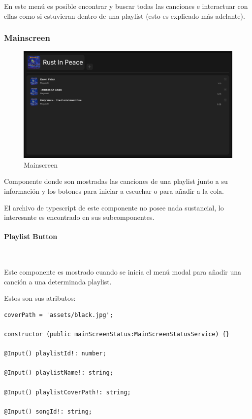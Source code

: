 \documentclass[11pt, a4paper]{article}
\begin{document}
                En este menú es posible encontrar y buscar todas las canciones e interactuar con ellas como si estuvieran dentro de una playlist (esto es explicado más adelante).



            \subsubsection{Mainscreen}

            \begin{figure}[H]
                \centering
                \includegraphics[width=1\textwidth]{media/screenshots/playlist.png}
                \caption{Mainscreen}
                \label{fig:Mainscreen}
            \end{figure}

            Componente donde son mostradas las canciones de una playlist junto a su información y los botones para iniciar a escuchar o para añadir a la cola.

            El archivo de typescript de este componente no posee nada sustancial, lo interesante es encontrado en sus subcomponentes.

                \paragraph{Playlist Button}
                ‎

                Este componente es mostrado cuando se inicia el menú modal para añadir una canción a una determinada playlist.

                Estos son sus atributos:

                \begin{lstlisting}[caption={Atributos Playlist Button}]
coverPath = 'assets/black.jpg';

constructor (public mainScreenStatus:MainScreenStatusService) {}

@Input() playlistId!: number;

@Input() playlistName!: string;

@Input() playlistCoverPath!: string;

@Input() songId!: string;
                \end{lstlisting}
\end{document}
